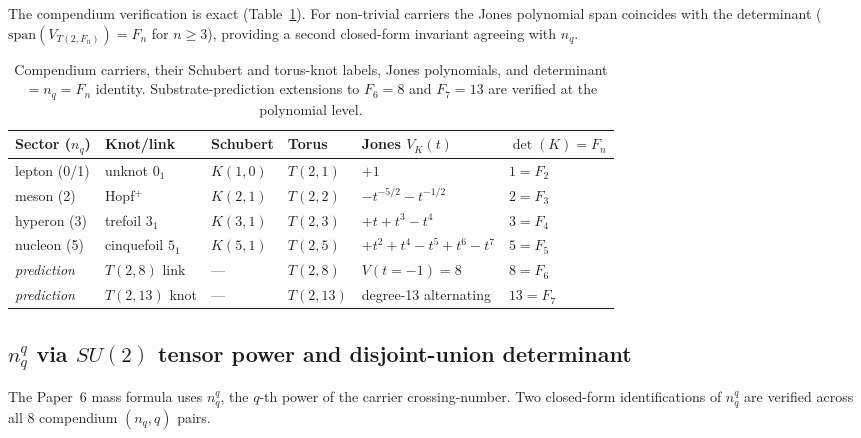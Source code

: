 \documentclass[11pt]{article}
\begin{document}
The compendium verification is exact (Table~\ref{tab:carrier-jones}).  For non-trivial carriers the Jones polynomial span coincides with the determinant ($\mathrm{span}(V_{T(2, F_n)}) = F_n$ for $n \geq 3$), providing a second closed-form invariant agreeing with $n_q$.

\begin{table}[h]
\centering
\caption{Compendium carriers, their Schubert and torus-knot labels, Jones polynomials, and determinant $= n_q = F_n$ identity.  Substrate-prediction extensions to $F_6 = 8$ and $F_7 = 13$ are verified at the polynomial level.}
\label{tab:carrier-jones}
\small
\begin{tabular}{llllll}
\toprule
Sector ($n_q$) & Knot/link & Schubert & Torus & Jones $V_K(t)$ & $\det(K) = F_n$ \\
\midrule
lepton (0/1)      & unknot $0_1$       & $K(1, 0)$ & $T(2, 1)$  & $+1$                                 & $1 = F_2$ \\
meson (2)         & Hopf$^+$           & $K(2, 1)$ & $T(2, 2)$  & $-t^{-5/2} - t^{-1/2}$               & $2 = F_3$ \\
hyperon (3)       & trefoil $3_1$      & $K(3, 1)$ & $T(2, 3)$  & $+t + t^3 - t^4$                     & $3 = F_4$ \\
nucleon (5)       & cinquefoil $5_1$   & $K(5, 1)$ & $T(2, 5)$  & $+t^2 + t^4 - t^5 + t^6 - t^7$       & $5 = F_5$ \\
\midrule
\emph{prediction} & $T(2, 8)$ link     & ---       & $T(2, 8)$  & $V(t = -1) = 8$                      & $8 = F_6$ \\
\emph{prediction} & $T(2, 13)$ knot    & ---       & $T(2, 13)$ & degree-13 alternating                & $13 = F_7$ \\
\bottomrule
\end{tabular}
\end{table}

\subsection{$n_q^q$ via $SU(2)$ tensor power and disjoint-union determinant}
\label{sec:nqq-tensor}

The Paper~6 mass formula uses $n_q^q$, the $q$-th power of the carrier crossing-number.  Two closed-form identifications of $n_q^q$ are verified across all $8$ compendium $(n_q, q)$ pairs.
\end{document}

